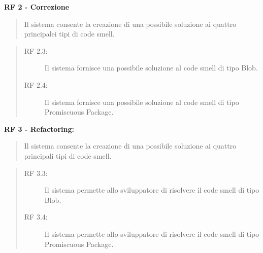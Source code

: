     	\begin{list}{-}{}
    		\item \textbf{RF 2 - Correzione} 
    		\begin{quote}Il sistema consente la creazione di una possibile soluzione ai quattro principalei tipi di code smell.\end{quote}
    		\begin{quote}
    			\begin{description}    		 	
    				\item [RF 2.3:]Il sistema fornisce una possibile soluzione al code smell di tipo Blob. 
    				\item[RF 2.4:] Il sistema fornisce una possibile soluzione al code smell di tipo Promiscuous Package.     			
    			\end{description}
    		\end{quote}
    		\item \textbf{RF 3 - Refactoring:} 
    		\begin{quote}Il sistema consente la creazione di una possibile soluzione ai quattro principali tipi di code smell.\end{quote}
    		\begin{quote}
    			\begin{description}
	    			\item[RF 3.3:]Il sistema permette allo sviluppatore di risolvere il code smell di tipo Blob.
	    			\item[RF 3.4:]Il sistema permette allo sviluppatore di risolvere il code smell di tipo Promiscuous Package.	
    			\end{description}
    		\end{quote}
    	\end{list}	
    
    \newpage	
    

